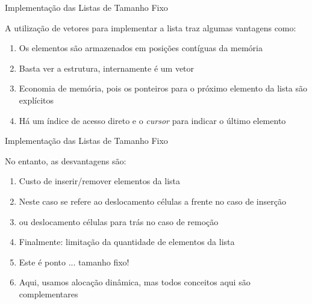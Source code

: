 \begin{frame}{Implementação das Listas de Tamanho Fixo}

A utilização de vetores para implementar a lista traz algumas vantagens como:	
  \begin{enumerate}
	\item Os elementos são armazenados em posições contíguas da memória
	\item Basta ver a estrutura, internamente é um vetor
	\item Economia de memória, pois os ponteiros para o próximo elemento da lista são explícitos
	\item Há um índice de acesso direto e o {\em cursor} para indicar o último elemento
\end{enumerate}

\end{frame}

\begin{frame}{Implementação das Listas de Tamanho Fixo}

No entanto, as desvantagens são:		
  \begin{enumerate}
\item Custo de inserir/remover elementos da lista 
\pause
\item Neste caso se refere ao deslocamento células a frente no caso de inserção
\pause
\item ou  deslocamento células para trás no caso de remoção
\pause
\item Finalmente: limitação da quantidade de elementos da lista
\item Este é ponto ... tamanho fixo!
\item Aqui, usamos alocação dinâmica, mas todos conceitos aqui são complementares
\end{enumerate}

\end{frame}

